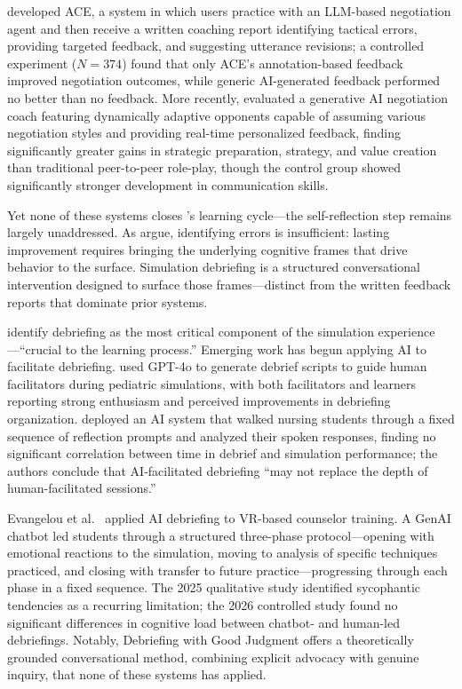 \citet{shea2024} developed ACE, a system in which users practice with an LLM-based negotiation agent and then receive a written coaching report identifying tactical errors, providing targeted feedback, and suggesting utterance revisions; a controlled experiment ($N=374$) found that only ACE's annotation-based feedback improved negotiation outcomes, while generic AI-generated feedback performed no better than no feedback. More recently, \citet{lirong2025} evaluated a generative AI negotiation coach featuring dynamically adaptive opponents capable of assuming various negotiation styles and providing real-time personalized feedback, finding significantly greater gains in strategic preparation, strategy, and value creation than traditional peer-to-peer role-play, though the control group showed significantly stronger development in communication skills.

Yet none of these systems closes \citeauthor{dinnar2021}'s \citeyearpar{dinnar2021} learning cycle---the self-reflection step remains largely unaddressed. As \citet{rudolph2007} argue, identifying errors is insufficient: lasting improvement requires bringing the underlying cognitive frames that drive behavior to the surface. Simulation debriefing is a structured conversational intervention designed to surface those frames---distinct from the written feedback reports that dominate prior systems.

\citet{fanning2007} identify debriefing as the most critical component of the simulation experience---``crucial to the learning process.'' Emerging work has begun applying AI to facilitate debriefing. \citet{hong2025} used GPT-4o to generate debrief scripts to guide human facilitators during pediatric simulations, with both facilitators and learners reporting strong enthusiasm and perceived improvements in debriefing organization. \citet{gonzalez2025} deployed an AI system that walked nursing students through a fixed sequence of reflection prompts and analyzed their spoken responses, finding no significant correlation between time in debrief and simulation performance; the authors conclude that AI-facilitated debriefing ``may not replace the depth of human-facilitated sessions.''

Evangelou et al.~\citep{evangelou2025, evangelou2026} applied AI debriefing to VR-based counselor training. A GenAI chatbot led students through a structured three-phase protocol---opening with emotional reactions to the simulation, moving to analysis of specific techniques practiced, and closing with transfer to future practice---progressing through each phase in a fixed sequence. The 2025 qualitative study identified sycophantic tendencies as a recurring limitation; the 2026 controlled study found no significant differences in cognitive load between chatbot- and human-led debriefings. Notably, Debriefing with Good Judgment \citep{rudolph2007} offers a theoretically grounded conversational method, combining explicit advocacy with genuine inquiry, that none of these systems has applied.

